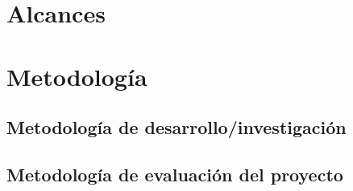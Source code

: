\documentclass[11pt,letterpaper]{article}
\begin{document}
\section{Alcances}


\section{Metodología}

\subsection{Metodología de desarrollo/investigación}


\subsection{Metodología de evaluación del proyecto}


%

%




\end{document}
